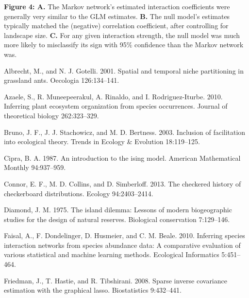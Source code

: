 \documentclass[12pt,]{article}
\begin{document}
\begin{spacing}{1.9}
\begin{flushleft}
\textbf{Figure 4: A.} The Markov network's estimated interaction
coefficients were generally very similar to the GLM estimates.
\textbf{B.} The null model's estimates typically matched the (negative)
correlation coefficient, after controlling for landscape size.
\textbf{C.} For any given interaction strength, the null model was much
more likely to misclassify its sign with 95\% confidence than the Markov
network was.

Albrecht, M., and N. J. Gotelli. 2001. Spatial and temporal niche
partitioning in grassland ants. Oecologia 126:134--141.

Azaele, S., R. Muneepeerakul, A. Rinaldo, and I. Rodriguez-Iturbe. 2010.
Inferring plant ecosystem organization from species occurrences. Journal
of theoretical biology 262:323--329.

Bruno, J. F., J. J. Stachowicz, and M. D. Bertness. 2003. Inclusion of
facilitation into ecological theory. Trends in Ecology \& Evolution
18:119--125.

Cipra, B. A. 1987. An introduction to the ising model. American
Mathematical Monthly 94:937--959.

Connor, E. F., M. D. Collins, and D. Simberloff. 2013. The checkered
history of checkerboard distributions. Ecology 94:2403--2414.

Diamond, J. M. 1975. The island dilemma: Lessons of modern biogeographic
studies for the design of natural reserves. Biological conservation
7:129--146.

Faisal, A., F. Dondelinger, D. Husmeier, and C. M. Beale. 2010.
Inferring species interaction networks from species abundance data: A
comparative evaluation of various statistical and machine learning
methods. Ecological Informatics 5:451--464.

Friedman, J., T. Hastie, and R. Tibshirani. 2008. Sparse inverse
covariance estimation with the graphical lasso. Biostatistics
9:432--441.


\end{flushleft}
\end{spacing}
\end{document}
